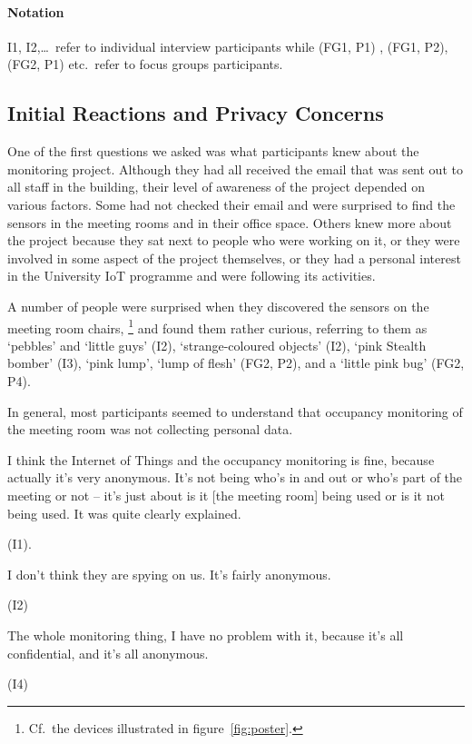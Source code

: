 \paragraph{Notation} I1, I2,\ldots\ refer to individual interview participants
while (FG1, P1) , (FG1, P2), (FG2, P1) etc.\ refer to focus groups participants.

\subsection{Initial Reactions and Privacy Concerns}
\label{sec:init-reactions}

One of the first questions we asked was what participants knew about
the monitoring project. Although they had all received the email that
was sent out to all staff in the building, their level of awareness of
the project depended on various factors. Some had not checked their
email and were surprised to find the sensors in the meeting rooms and
in their office space. Others knew more about the project because they sat next
to people who were working on it, or they were involved in some
aspect of the project themselves, or they had a personal interest in the
University IoT programme and were following its activities.

A number of people were surprised when they discovered the sensors on
the meeting room chairs,%
\footnote{ Cf.\ the devices illustrated in figure~\ref{fig:poster}.  }
and found them rather curious, referring to them as `pebbles’ and
‘little guys’ (I2), `strange-coloured objects’ (I2), `pink Stealth
bomber’ (I3), `pink lump’, `lump of flesh’ (FG2, P2), and a ‘little
pink bug’ (FG2, P4).

In general, most participants seemed to understand that occupancy
monitoring of the meeting room was not collecting personal data.

\begin{qt}I think the Internet of Things and the occupancy monitoring is fine,
because actually it’s very anonymous. It’s not being who’s in and out
or who’s part of the meeting or not – it’s just about is it [the meeting room] being used
or is it not being used. It was quite clearly explained.\end{qt}
(I1).

\begin{qt}I don’t think they are spying on us. It’s fairly anonymous.\end{qt} (I2)

\begin{qt}The whole monitoring thing, I have no problem with it, because it’s
all confidential, and it’s all anonymous.\end{qt} (I4)

